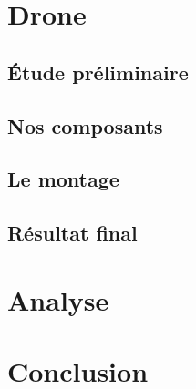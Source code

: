 \documentclass{beamer}
\begin{document}
  {
    \section{Drone}
    
      \subsection{Étude préliminaire}
	\begin{frame}
	  
	\end{frame}
      
      \subsection{Nos composants}
	\begin{frame}
	 
	\end{frame}

      
      \subsection{Le montage}
	\begin{frame}
	 
	\end{frame}

      
      \subsection{Résultat final}
	\begin{frame}
	 
	\end{frame}


  }
  
  {
    \section{Analyse}
  }
  
  {
    \section{Conclusion}
  }
\end{document}
